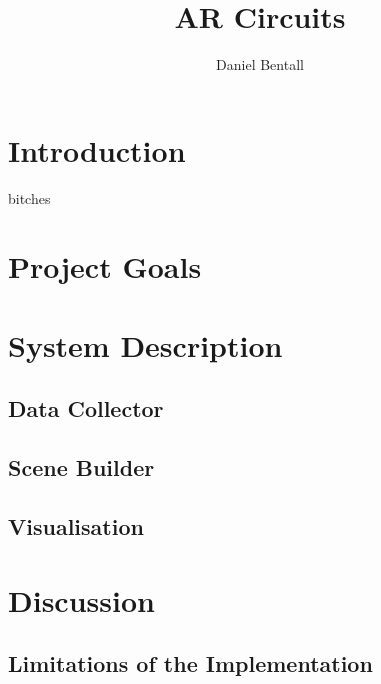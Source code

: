 \documentclass[11pt,journal,compsoc]{IEEEtran}
\begin{document}
\title{AR Circuits}

\author{Daniel Bentall}%

\IEEEcompsoctitleabstractindextext{%
\begin{abstract}
\end{abstract}
}

\maketitle

\IEEEdisplaynotcompsoctitleabstractindextext

\IEEEpeerreviewmaketitle

\section{Introduction}

 bitches \cite{orc13}

\section{Project Goals}

\section{System Description}

\subsection{Data Collector}

\subsection{Scene Builder}

\subsection{Visualisation}

\section{Discussion}

\subsection{Limitations of the Implementation}
\end{document}
